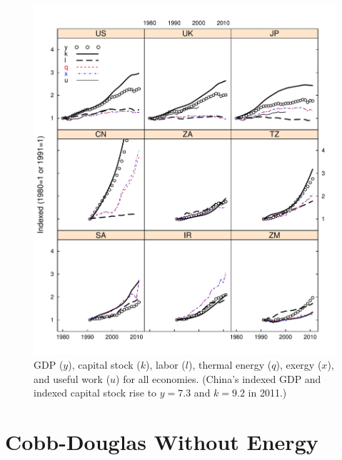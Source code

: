 \documentclass[preprint,authoryear,12pt]{elsarticle}\usepackage{graphicx, color}
\makeatletter
\def\maxwidth{ %
  \ifdim\Gin@nat@width>\linewidth
    \linewidth
  \else
    \Gin@nat@width
  \fi
}
\newenvironment{knitrout}{}{} %
\makeatother
\begin{document}
\begin{knitrout}
\color{fgcolor}\begin{figure}[]

\includegraphics[width=\maxwidth]{figure/Factors_Lattice_Graph} \caption[GDP ($y$), capital stock ($k$), labor ($l$), thermal energy ($q$), exergy ($x$), and useful work ($u$) for all economies]{GDP ($y$), capital stock ($k$), labor ($l$), thermal energy ($q$), exergy ($x$), and useful work ($u$) for all economies. (China's indexed GDP and indexed capital stock rise to $y = 7.3$ and $k = 9.2$ in 2011.)\label{fig:Factors Lattice Graph}}
\end{figure}


\end{knitrout}


\section{Cobb-Douglas Without Energy}
\end{document}
